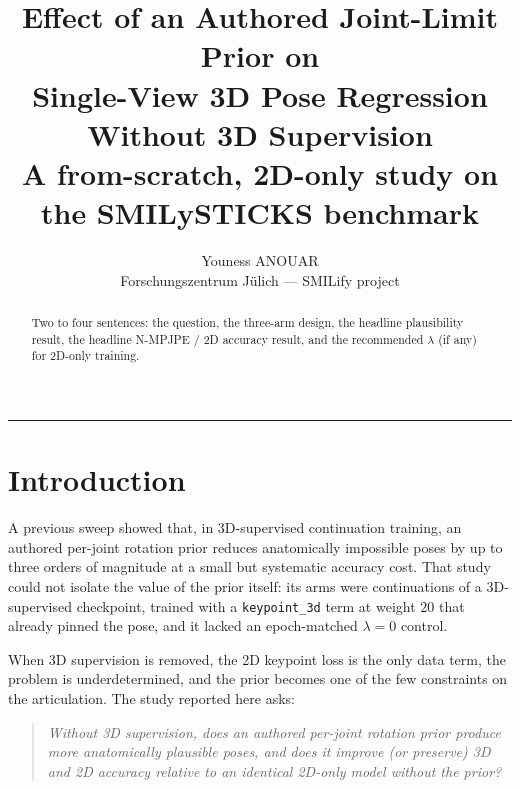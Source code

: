 \documentclass[11pt,a4paper]{article}
\title{\textbf{Effect of an Authored Joint-Limit Prior on\\
Single-View 3D Pose Regression Without 3D Supervision}\\[0.4em]
\large A from-scratch, 2D-only study on the SMILySTICKS benchmark}
\author{%
  Youness ANOUAR\\
  \small Forschungszentrum J\"ulich --- SMILify project
}
\date{\PH{date}}
\newcommand{\lam}{\lambda}
\newif\iffinal
\newcommand{\PH}[1]{#1}
\newcommand{\PH}[1]{\textcolor{red}{[#1]}}
\begin{document}
\maketitle

\iffinal\else
\begin{center}
\end{center}
\fi

\begin{abstract}
\PH{Two to four sentences: the question, the three-arm design, the headline
plausibility result, the headline N-MPJPE / 2D accuracy result, and the
recommended $\lam$ (if any) for 2D-only training.}
\end{abstract}

\noindent\rule{\textwidth}{0.4pt}

\section{Introduction}
\label{sec:intro}

A previous sweep showed that, in 3D-supervised continuation training, an
authored per-joint rotation prior reduces anatomically impossible poses by up to
three orders of magnitude at a small but systematic accuracy cost. That study
could not isolate the value of the prior itself: its arms were continuations of a
3D-supervised checkpoint, trained with a \texttt{keypoint\_3d} term at weight
$20$ that already pinned the pose, and it lacked an epoch-matched $\lam = 0$
control.

When 3D supervision is removed, the 2D keypoint loss is the only data term, the
problem is underdetermined, and the prior becomes one of the few constraints on
the articulation. The study reported here asks:

\begin{quote}
\emph{Without 3D supervision, does an authored per-joint rotation prior produce
more anatomically plausible poses, and does it improve (or preserve) 3D and 2D
accuracy relative to an identical 2D-only model without the prior?}
\end{quote}
\end{document}
